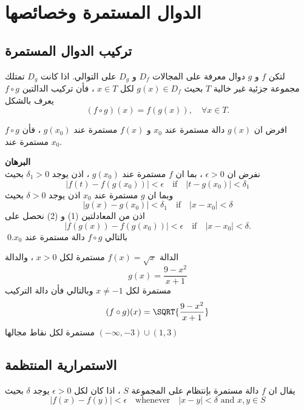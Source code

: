 \chapter{الدوال المستمرة وخصائصها}

\section{تركيب الدوال المستمرة}

\begin{definition}
	لتكن $f$ و $g$ دوال معرفة على المجالات $D_f$ و $D_g$ على التوالي. اذا كانت $D_g$ تمتلك مجموعة جزئية غير خالية $T$ بحيث $g(x) \in D_f$ لكل $x\in T$ ، فأن تركيب الدالتين $f\circ g$ يعرف بالشكل
	\[
	(f \circ g)(x) = f(g(x)), \quad \forall x\in T.
	\]
\end{definition}

\begin{theorem}
	افرض ان $g(x)$ دالة مستمرة عند $x_0 $ و $f(x)$ مستمرة عند $g(x_0)$  ، فأن $f\circ g$ مستمرة عند $x_0$.
\end{theorem}
\noindent
\textbf{البرهان}\\
\noindent
نفرض ان $\epsilon > 0 $ ، بما ان $f$ مستمرة عند $g(x_0)$ ، اذن يوجد $\delta_1> 0 $ بحيث
\begin{equation}
	| f(t)  - f(g(x_0))| < \epsilon \quad\text{if}\quad |t - g(x_0)| < \delta_1
\end{equation}
وبما ان $g$ مستمرة عند $x_0 $ اذن يوجد $\delta > 0 $ بحيث
\begin{equation}
	|g(x) - g(x_0) | < \delta_1 \quad\text{if}\quad |x-x_0| < \delta
\end{equation}
اذن من المعادلتين (1) و (2) نحصل على 
\[
|f(g(x)) - f(g(x_0)) | < \epsilon \quad\text{if}\quad |x-x_0| < \delta.
\] 
بالتالي $f\circ g$ دالة مستمرة عند $x_0$.\qed

\begin{example}
	الدالة $f(x) = \sqrt{x}$ مستمرة لكل $x> 0 $ ، والدالة
	\[
	g(x) = \frac{9 - x^2}{x + 1} 
	\]
	مستمرة لكل $x \neq -1 $ وبالتالي فأن دالة التركيب 
	\[
	(f\circ g)(x) = \SQRT{\frac{9-x^2}{x+1}}
	\]
	مستمرة لكل نقاط مجالها  
	$(-\infty, -3) \cup (1,3)$
\end{example}

\section[الاستمرارية المنتظمة]{الاستمرارية المنتظمة \cite{introrealanal}}

\begin{definition}
	يقال ان $f$ دالة مستمرة بإنتظام على المجموعة $S$ ، اذا كان لكل  $\epsilon > 0 $ يوجد $\delta$ بحيث
	\[
	|f(x) - f(y) | < \epsilon \quad\text{whenever}\quad |x-y| < \delta \,\, \text{and}\,\, x,y\in S
	\] 
\end{definition}

